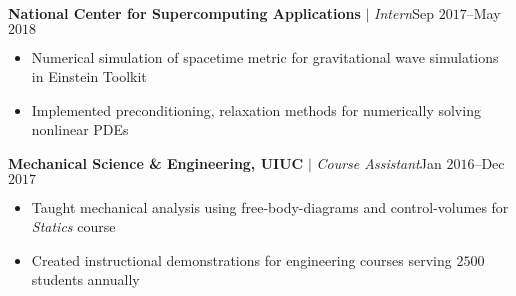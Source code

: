 \documentclass[10pt]{article}
\begin{document}
\begin{multicols}{2}
\vspace{0.5em}
%
\textbf{National Center for Supercomputing Applications} $|$ \textit{Intern}\hfill Sep $2017$--May $2018$

\vspace{-1.75em}
\begin{itemize}[label=-,leftmargin=1.0em]
    \setlength\itemsep{-0.25em}
    \item Numerical simulation of spacetime metric for gravitational wave simulations in Einstein Toolkit
    \item Implemented preconditioning, relaxation methods for numerically solving nonlinear PDEs
\end{itemize}
\vspace{-2.0em}

\vspace{0.5em}
%
\textbf{Mechanical Science \& Engineering, UIUC} $|$ \textit{Course Assistant}\hfill Jan $2016$--Dec $2017$

\vspace{-1.75em}
\begin{itemize}[label=-,leftmargin=1.0em]
    \setlength\itemsep{-0.25em}
    \item Taught mechanical analysis using free-body-diagrams and control-volumes for \textit{Statics} course
    \item Created instructional demonstrations for engineering courses serving $2500$ students annually
\end{itemize}
\vspace{-2.0em}

\end{multicols}
\vspace{-1.5em}
%
\end{document}
